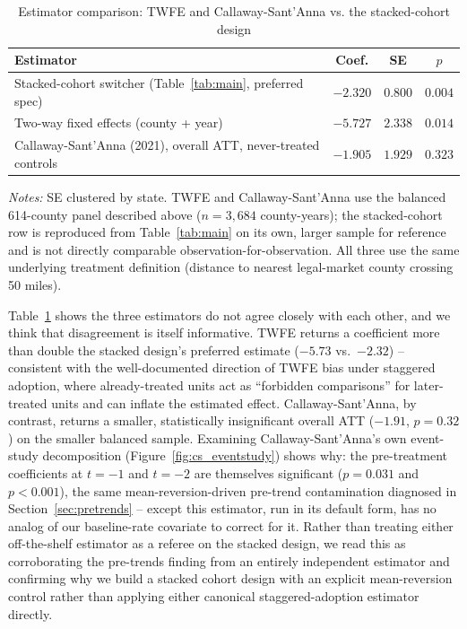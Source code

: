 \documentclass[12pt]{article}
\begin{document}
\begin{table}[htbp]
\centering
\caption{Estimator comparison: TWFE and Callaway-Sant'Anna vs. the stacked-cohort design}
\label{tab:twfecs}
\begin{tabular}{@{}lccc@{}}
\toprule
Estimator & Coef. & SE & $p$ \\
\midrule
Stacked-cohort switcher (Table~\ref{tab:main}, preferred spec) & $-2.320$ & $0.800$ & $0.004$ \\
Two-way fixed effects (county + year) & $-5.727$ & $2.338$ & $0.014$ \\
Callaway-Sant'Anna (2021), overall ATT, never-treated controls & $-1.905$ & $1.929$ & $0.323$ \\
\bottomrule
\end{tabular}
\vspace{2pt}
\begin{minipage}{0.92\textwidth}
\footnotesize\emph{Notes:} SE clustered by state. TWFE and
Callaway-Sant'Anna use the balanced 614-county panel described above
($n=3{,}684$ county-years); the stacked-cohort row is reproduced from
Table~\ref{tab:main} on its own, larger sample for reference and is not
directly comparable observation-for-observation. All three use the
same underlying treatment definition (distance to nearest legal-market
county crossing 50 miles).
\end{minipage}
\end{table}

Table~\ref{tab:twfecs} shows the three estimators do not agree closely
with each other, and we think that disagreement is itself informative.
TWFE returns a coefficient more than double the stacked design's
preferred estimate ($-5.73$ vs.\ $-2.32$) -- consistent with the
well-documented direction of TWFE bias under staggered adoption, where
already-treated units act as ``forbidden comparisons'' for later-treated
units and can inflate the estimated effect. Callaway-Sant'Anna, by
contrast, returns a smaller, statistically insignificant overall ATT
($-1.91$, $p=0.32$) on the smaller balanced sample. Examining
Callaway-Sant'Anna's own event-study decomposition
(Figure~\ref{fig:cs_eventstudy}) shows why: the pre-treatment
coefficients at $t=-1$ and $t=-2$ are themselves significant
($p=0.031$ and $p<0.001$), the same mean-reversion-driven pre-trend
contamination diagnosed in Section~\ref{sec:pretrends} -- except this
estimator, run in its default form, has no analog of our baseline-rate
covariate to correct for it. Rather than treating either off-the-shelf
estimator as a referee on the stacked design, we read this as
corroborating the pre-trends finding from an entirely independent
estimator and confirming why we build a stacked cohort design with an
explicit mean-reversion control rather than applying either canonical
staggered-adoption estimator directly.
\end{document}
